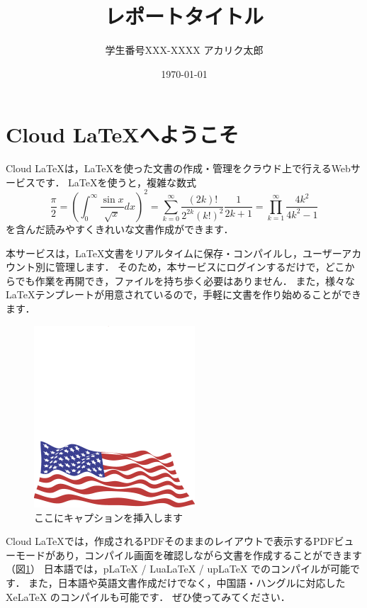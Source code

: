 \documentclass{jsarticle}
\title{レポートタイトル}
\author{学生番号XXX-XXXX アカリク太郎}
\date{\today}
\begin{document}
\maketitle
\section{Cloud LaTeXへようこそ}

Cloud LaTeXは，\LaTeX を使った文書の作成・管理をクラウド上で行えるWebサービスです．
\LaTeX を使うと，複雑な数式
\begin{equation}
  \frac{\pi}{2} =
  \left( \int_{0}^{\infty} \frac{\sin x}{\sqrt{x}} dx \right)^2 =
  \sum_{k=0}^{\infty} \frac{(2k)!}{2^{2k}(k!)^2} \frac{1}{2k+1} =
  \prod_{k=1}^{\infty} \frac{4k^2}{4k^2 - 1}
\end{equation}
を含んだ読みやすくきれいな文書作成ができます．

本サービスは，\LaTeX 文書をリアルタイムに保存・コンパイルし，ユーザーアカウント別に管理します．
そのため，本サービスにログインするだけで，どこからでも作業を再開でき，ファイルを持ち歩く必要はありません．
また，様々な \LaTeX テンプレートが用意されているので，手軽に文書を作り始めることができます．

\begin{figure}
 \centering
   \includegraphics[width=60mm]{figures/Sample.eps}
 \caption{ここにキャプションを挿入します}
 \label{fig:model}
\end{figure}

Cloud LaTeXでは，作成されるPDFそのままのレイアウトで表示するPDFビューモードがあり，コンパイル画面を確認しながら文書を作成することができます（図\ref{fig:model}）
日本語では，pLaTeX / LuaLaTeX / upLaTeX でのコンパイルが可能です．
また，日本語や英語文書作成だけでなく，中国語・ハングルに対応した XeLaTeX のコンパイルも可能です．
ぜひ使ってみてください．
\end{document}
